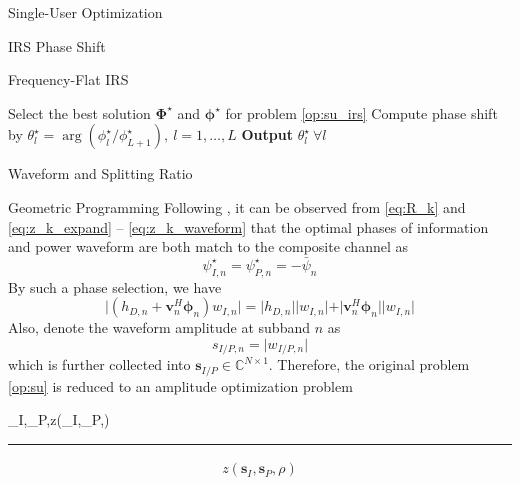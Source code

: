 \documentclass{IEEEtran}
\begin{document}
\begin{section}{Single-User Optimization}
\begin{subsection}{IRS Phase Shift}
\begin{subsubsection}{Frequency-Flat IRS}
\begin{algorithm}
\begin{algorithmic}[1]
					\State Select the best solution $\boldsymbol{\Phi}^\star$ and $\boldsymbol{\phi}^\star$ for problem \ref{op:su_irs}
					\State Compute phase shift by $\theta_l^\star=\arg(\phi_l^\star/\phi_{L+1}^\star), \ l=1,\dots,L$
					\State \textbf{Output} $\theta_l^\star \ \forall l$
				\end{algorithmic}
			\end{algorithm}
		\end{subsubsection}
	\end{subsection}

	\begin{subsection}{Waveform and Splitting Ratio}
		\begin{subsubsection}{Geometric Programming}
			Following \cite{Clerckx2018b}, it can be observed from \ref{eq:R_k} and \ref{eq:z_k_expand} -- \ref{eq:z_k_waveform} that the optimal phases of information and power waveform are both match to the composite channel as
			\begin{equation}\label{eq:psi}
				\psi_{I,n}^{\star}=\psi_{P,n}^{\star}=-\bar{\psi}_{n}
			\end{equation}
			By such a phase selection, we have
			\begin{equation}
				\lvert{(h_{D,n}+\boldsymbol{v}_n^H\boldsymbol{\phi}_n)w_{I,n}}\rvert = \lvert h_{D,n} \rvert \lvert w_{I,n} \rvert + \vert \boldsymbol{v}_n^H\boldsymbol{\phi}_n \rvert \lvert w_{I,n} \rvert
			\end{equation}
			Also, denote the waveform amplitude at subband $n$ as
			\begin{equation}\label{eq:s}
				s_{I/P,n} = \lvert w_{I/P,n} \rvert
			\end{equation}
			which is further collected into $\boldsymbol{s}_{I/P} \in \mathbb{C}^{N \times 1}$. Therefore, the original problem \ref{op:su} is reduced to an amplitude optimization problem
			\begin{maxi!}
					{\boldsymbol{s}_I,_P,\rho}{z(_I,_P,\rho)}{\label{op:su_gp}}{}
				\end{maxi!}
			\begin{figure*}[b]
				\hrule
				\begin{equation}\label{eq:z_gp}
					\begin{split}
						z(\boldsymbol{s}_I,\boldsymbol{s}_P,\rho)

\end{split}
\end{equation}
\end{figure*}
\end{subsubsection}
\end{subsection}
\end{section}
\end{document}
